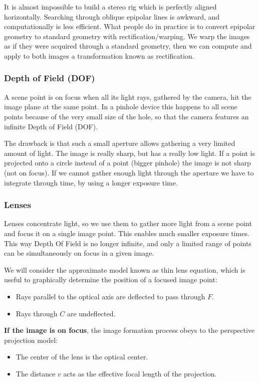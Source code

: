 It is almost impossible to build a stereo rig which is perfectly aligned horizontally.
Searching through oblique epipolar lines is awkward, and computationally is less efficient.
What people do in practice is to convert epipolar geometry to standard geometry with rectification/warping.
We warp the images as if they were acquired through a standard geometry, then we can compute and apply to both images a transformation known as rectification.

\subsubsection{Depth of Field (DOF)}

A scene point is on focus when all its light rays, gathered by the camera, hit the image plane at the same point.
In a pinhole device this happens to all scene points because of the very small size of the hole, so that the camera features an infinite Depth of Field (DOF).

The drawback is that such a small aperture allows gathering a very limited amount of light.
The image is really sharp, but has a really low light.
If a point is projected onto a circle instead of a point (bigger pinhole) the image is not sharp (not on focus).
If we cannot gather enough light through the aperture we have to integrate through time, by using a longer exposure time.

\subsubsection{Lenses}

Lenses concentrate light, so we use them to gather more light from a scene point and focus it on a single image point.
This enables much smaller exposure times.
This way Depth Of Field is no longer infinite, and only a limited range of points can be simultaneously on focus in a given image.

We will consider the approximate model known as thin lens equation, which is useful to graphically determine the position of a focused image point:
\begin{itemize}
  \item Rays parallel to the optical axis are deflected to pass through $F$.
  \item Rays through $C$ are undeflected.
\end{itemize}

\textbf{If the image is on focus}, the image formation process obeys to the perspective projection model:
\begin{itemize}
  \item The center of the lens is the optical center.
  \item The distance $v$ acts as the effective focal length of the projection.
\end{itemize}

